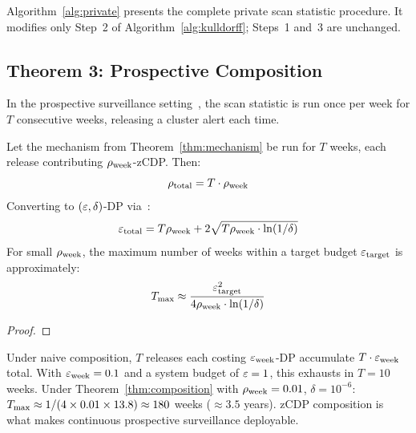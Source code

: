 Algorithm~\ref{alg:private} presents the complete private scan statistic procedure.
It modifies only Step~2 of Algorithm~\ref{alg:kulldorff}; Steps~1 and~3 are unchanged.




\subsection{Theorem 3: Prospective Composition}
\label{sec:method:composition}

In the prospective surveillance setting~\cite{kulldorff2001}, the scan statistic is
run once per week for $T$ consecutive weeks, releasing a cluster alert each time.

\begin{theorem}
\label{thm:composition}
Let the mechanism from Theorem~\ref{thm:mechanism} be run for $T$ weeks, each release
contributing $\rho_{\mathrm{week}}$-zCDP.
Then:
\[
    \rho_{\mathrm{total}} = T \cdot \rho_{\mathrm{week}}
\]
Converting to $(\varepsilon, \delta)$-DP via~\cite{bun2016}:
\[
    \varepsilon_{\mathrm{total}} = T\rho_{\mathrm{week}} + 2\sqrt{T\rho_{\mathrm{week}} \cdot \ln(1/\delta)}
\]
For small $\rho_{\mathrm{week}}$, the maximum number of weeks within a target budget $\varepsilon_{\mathrm{target}}$
is approximately:
\[
    T_{\max} \approx \frac{\varepsilon_{\mathrm{target}}^2}{4\rho_{\mathrm{week}} \cdot \ln(1/\delta)}
\]
\end{theorem}

\begin{proof}
\end{proof}

\begin{remark}
Under naive composition, $T$ releases each costing $\varepsilon_{\mathrm{week}}$-DP accumulate
$T \cdot \varepsilon_{\mathrm{week}}$ total.
With $\varepsilon_{\mathrm{week}} = 0.1$ and a system budget of $\varepsilon = 1$, this exhausts in
$T = 10$ weeks.
Under Theorem~\ref{thm:composition} with $\rho_{\mathrm{week}} = 0.01$, $\delta = 10^{-6}$:
$T_{\max} \approx 1 / (4 \times 0.01 \times 13.8) \approx 180$ weeks ($\approx 3.5$ years).
zCDP composition is what makes continuous prospective surveillance deployable.
\end{remark}
